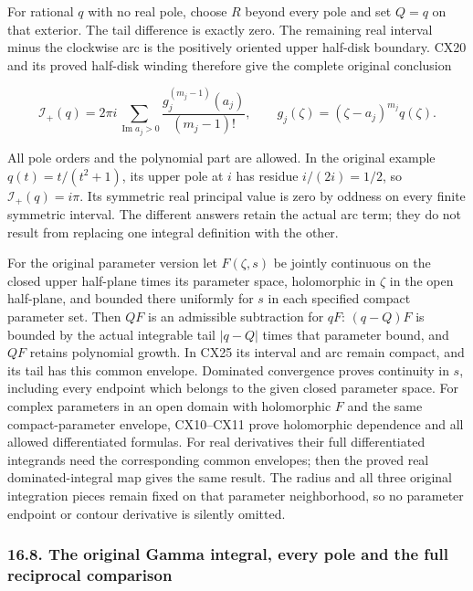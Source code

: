 \documentclass[
  11pt,
]{article}
\makeatletter
\let\ReaderOriginalAnchorStart\hyper@anchorstart
\let\ReaderOriginalAnchorEnd\hyper@anchorend
\let\ReaderPendingAliases\@empty
\def\ReaderArmAliases#1{\gdef\ReaderPendingAliases{#1}}
\def\hyper@anchorstart#1{\ReaderIfNativeAnchorTF{#1}{\ReaderPendingAliases\global\let\ReaderPendingAliases\@empty}{}\ReaderOriginalAnchorStart{#1}}
\makeatother
\begin{document}
For rational \(q\) with no real pole, choose \(R\) beyond every pole and
set \(Q=q\) on that exterior. The tail difference is exactly zero. The
remaining real interval minus the clockwise arc is the positively
oriented upper half-disk boundary. CX20 and its proved half-disk winding
therefore give the complete original conclusion

\[
\mathcal I_+(q)=2\pi i
 \sum_{\operatorname{Im}a_j>0}
           \frac{g_j^{(m_j-1)}(a_j)}{(m_j-1)!},
\qquad
g_j(\zeta)=(\zeta-a_j)^{m_j}q(\zeta).
\tag{CX28}
\]

All pole orders and the polynomial part are allowed. In the original
example \(q(t)=t/(t^2+1)\), its upper pole at \(i\) has residue
\(i/(2i)=1/2\), so \(\mathcal I_+(q)=i\pi\). Its symmetric real
principal value is zero by oddness on every finite symmetric interval.
The different answers retain the actual arc term; they do not result
from replacing one integral definition with the other.

For the original parameter version let \(F(\zeta,s)\) be jointly
continuous on the closed upper half-plane times its parameter space,
holomorphic in \(\zeta\) in the open half-plane, and bounded there
uniformly for \(s\) in each specified compact parameter set. Then \(QF\)
is an admissible subtraction for \(qF\): \((q-Q)F\) is bounded by the
actual integrable tail \(|q-Q|\) times that parameter bound, and \(QF\)
retains polynomial growth. In CX25 its interval and arc remain compact,
and its tail has this common envelope. Dominated convergence proves
continuity in \(s\), including every endpoint which belongs to the given
closed parameter space. For complex parameters in an open domain with
holomorphic \(F\) and the same compact-parameter envelope, CX10--CX11
prove holomorphic dependence and all allowed differentiated formulas.
For real derivatives their full differentiated integrands need the
corresponding common envelopes; then the proved real dominated-integral
map gives the same result. The radius and all three original integration
pieces remain fixed on that parameter neighborhood, so no parameter
endpoint or contour derivative is silently omitted.

\ReaderArmAliases{\ReaderOriginalAnchorStart{AN03-CN-COMPLEX-008}\ReaderOriginalAnchorEnd\begingroup\expandafter\def\csname @currentHref\endcsname{AN03-CN-COMPLEX-008}\label{AN03-CN-COMPLEX-008}\endgroup\ReaderOriginalAnchorStart{the-original-gamma-integral-every-pole-and-the-full-reciprocal-comparison}\ReaderOriginalAnchorEnd}
\subsubsection{16.8. The original Gamma integral, every pole and the
full reciprocal
comparison}\label{the-original-gamma-integral-every-pole-and-the-full-reciprocal-comparison}
\end{document}
